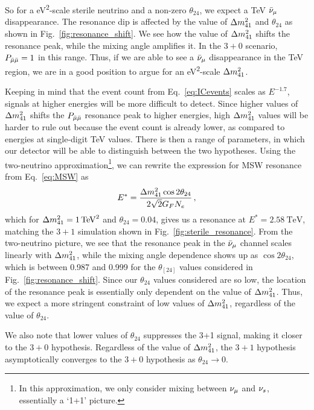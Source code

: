 So for a \si{\eV^2}-scale sterile neutrino and a non-zero $\theta_{24}$, we expect a \si{\TeV} $\bar{\nu}_\mu$ disappearance.
The resonance dip is affected by the value of $\dm[41]$ and $\theta_{24}$ as shown in Fig.~\ref{fig:resonance_shift}.
We see how the value of $\dm[41]$ shifts the resonance peak, while the mixing angle amplifies it. 
In the $3+0$ scenario, $P_{\bar{\mu} \bar{\mu}} = 1$ in this range. Thus, if we are able to see a $\bar{\nu}_\mu$ disappearance in the \si{\TeV} region,
we are in a good position to argue for an \si{\eV^2}-scale $\dm[41]$.  

Keeping in mind that the event count from Eq.~\ref{eq:ICevents} scales as $E^{-1.7}$,
signals at higher energies will be more difficult to detect. Since higher values of $\dm[41]$ shifts the $P_{\bar{\mu} \bar{\mu}}$ resonance peak to higher 
energies, high $\dm[41]$ values will be harder to rule out because the event count is already lower, as compared to energies 
at single-digit \si{\TeV} values. There is then a range of parameters, in which our detector will 
be able to distinguish between the two hypotheses. Using the two-neutrino approximation\footnote{In this approximation, we only consider mixing between $\nu_\mu$ and $\nu_s$, essentially a `1+1' picture.}, 
we can rewrite the expression for MSW resonance from Eq.~\ref{eq:MSW} as 
\begin{align}
    E^* = \frac{\dm[41] \cos{2\theta_{24}}}{2\sqrt{2} G_F N_e}\,,
\end{align}
which for $\dm[41] = \SI{1}{\TeV^2}$ and $\theta_{24} = 0.04$, gives us a resonance at $E^* = \SI{2.58}{\TeV}$, matching the $3+1$ simulation shown in
Fig.~\ref{fig:sterile_resonance}. From the two-neutrino picture, 
we see that the resonance peak in the $\bar{\nu}_\mu$ channel scales linearly with $\dm[41]$, while the mixing angle dependence 
shows up as $\cos{2\theta_{24}}$, which is between 0.987 and 0.999 for the $\theta_[24]$ values considered in Fig.~\ref{fig:resonance_shift}.
Since our $\theta_{24}$ values considered are so low, the location of the resonance peak is essentially only dependent on the value of $\dm[41]$.
Thus, we expect a more stringent constraint of low values of $\dm[41]$, regardless of the value of $\theta_{24}$.

We also note that lower values of $\theta_{24}$ suppresses the 3+1 signal, making it closer to the $3+0$ hypothesis. 
Regardless of the value of $\dm[41]$, the $3+1$ hypothesis asymptotically converges to the $3+0$ hypothesis as $\theta_{24} \to 0$.